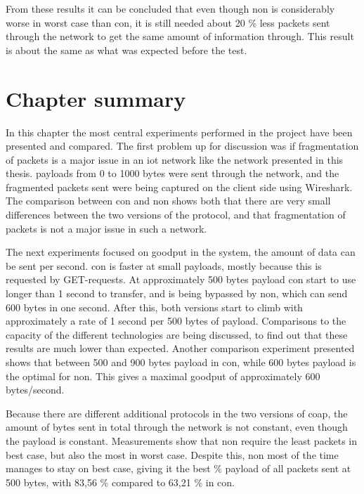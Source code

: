 \noindent From these results it can be concluded that even though \gls{non} is considerably worse in worst case than \gls{con}, it is still needed about 20 \% less packets sent through the network to get the same amount of information through. This result is about the same as what was expected before the test. 



\section{Chapter summary}

\noindent In this chapter the most central experiments performed in the project have been presented and compared. The first problem up for discussion was if fragmentation of packets is a major issue in an \gls{iot} network like the network presented in this thesis. \Glspl{payload} from 0 to 1000 bytes were sent through the network, and the fragmented packets sent were being captured on the client side using Wireshark. The comparison between \gls{con} and \gls{non} shows both that there are very small differences between the two versions of the protocol, and that fragmentation of packets is not a major issue in such a network. 

\noindent The next experiments focused on \gls{goodput} in the system, the amount of data can be sent per second. \gls{con} is faster at small \glspl{payload}, mostly because this is requested by GET-requests. At approximately 500 bytes \gls{payload} \gls{con} start to use longer than 1 second to transfer, and is being bypassed by \gls{non}, which can send 600 bytes in one second. After this, both versions start to climb with approximately a rate of 1 second per 500 bytes of \gls{payload}. Comparisons to the capacity of the different technologies are being discussed, to find out that these results are much lower than expected. Another comparison experiment presented shows that between 500 and 900 bytes \gls{payload} in \gls{con}, while 600 bytes \gls{payload} is the optimal for \gls{non}. This gives a maximal \gls{goodput} of approximately 600 bytes/second. 

\noindent Because there are different additional protocols in the two versions of \gls{coap}, the amount of bytes sent in total through the network is not constant, even though the \gls{payload} is constant. Measurements show that \gls{non} require the least packets in best case, but also the most in worst case. Despite this, \gls{non} most of the time manages to stay on best case, giving it the best \% payload of all packets sent at 500 bytes, with 83,56 \% compared to 63,21 \% in \gls{con}.   


